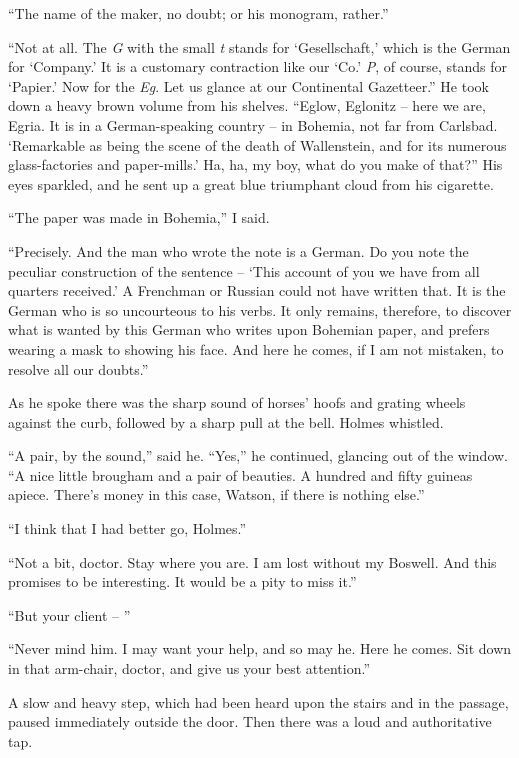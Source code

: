 “The name of the maker, no doubt; or his monogram,
rather.”

“Not at all. The \textit{G} with the small \textit{t} stands for
‘Gesellschaft,’ which is the German for ‘Company.’ It is a
customary contraction like our ‘Co.’ \textit{P}, of course, stands for
‘Papier.’ Now for the \textit{Eg}. Let us glance at our Continental
Gazetteer.” He took down a heavy brown volume from his
shelves. “Eglow, Eglonitz -- here we are, Egria. It is in a
German-speaking country -- in Bohemia, not far from Carlsbad.
‘Remarkable as being the scene of the death of Wallenstein, and
for its numerous glass-factories and paper-mills.’ Ha, ha, my
boy, what do you make of that?” His eyes sparkled, and he
sent up a great blue triumphant cloud from his cigarette.

“The paper was made in Bohemia,” I said.

“Precisely. And the man who wrote the note is a German.
Do you note the peculiar construction of the sentence -- ‘This
account of you we have from all quarters received.’ A
Frenchman or Russian could not have written that. It is the German
who is so uncourteous to his verbs. It only remains,
therefore, to discover what is wanted by this German who
writes upon Bohemian paper, and prefers wearing a mask to
showing his face. And here he comes, if I am not mistaken,
to resolve all our doubts.”

As he spoke there was the sharp sound of horses’ hoofs and
grating wheels against the curb, followed by a sharp pull at
the bell. Holmes whistled.

“A pair, by the sound,” said he. “Yes,” he continued,
glancing out of the window. “A nice little brougham and a
pair of beauties. A hundred and fifty guineas apiece. There’s
money in this case, Watson, if there is nothing else.”

“I think that I had better go, Holmes.”

“Not a bit, doctor. Stay where you are. I am lost without
my Boswell. And this promises to be interesting. It
would be a pity to miss it.”

“But your client -- ”

“Never mind him. I may want your help, and so may he.
Here he comes. Sit down in that arm-chair, doctor, and give
us your best attention.”

A slow and heavy step, which had been heard upon the
stairs and in the passage, paused immediately outside the
door. Then there was a loud and authoritative tap.

